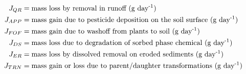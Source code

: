 \documentclass[fleqn, oneside, 11pt]{article}%
\begin{document}
\begin{preview}
\begin{align*}
J_{QR} & =  \text{mass loss by removal in runoff (g day\textsuperscript{-1})} \nonumber \\
J_{APP} & =  \text{mass gain due to pesticide deposition on the soil surface (g day\textsuperscript{-1})} \nonumber \\
J_{FOF} & =  \text{mass gain due to washoff from plants to soil (g day\textsuperscript{-1})} \nonumber \\
J_{DS} & =  \text{mass loss due to degradation of sorbed phase chemical (g day\textsuperscript{-1})} \nonumber \\
J_{ER} & =  \text{mass loss by dissolved removal on eroded sediments (g day\textsuperscript{-1})} \nonumber \\
J_{TRN} & =  \text{mass gain or loss due to parent/daughter transformations (g day\textsuperscript{-1})} \nonumber \\
\end{align*} 
\end{preview}
\end{document}
